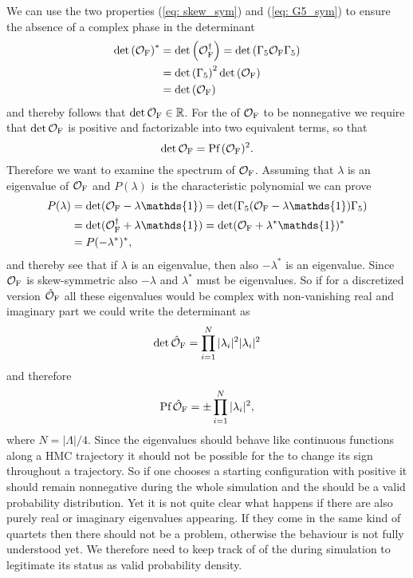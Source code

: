 %
%
We can use the two properties (\ref{eq: skew_sym}) and (\ref{eq: G5_sym}) to ensure the absence of a complex phase in the determinant
%
%
\begin{align}
\det \left(\mathcal{O}_{\rm F}\right)^{*} &= \det  \left( \mathcal{O}_{\rm F}^{\dagger}\right) = \det \left( \Gamma_{5}\mathcal{O}_{\rm F} \Gamma_{5} \right) \notag \\
%
%
&= \det \left(\Gamma_{5}\right)^{2} \det \left(\mathcal{O}_{\rm F}\right) \\
%
%
&= \det \left(\mathcal{O}_{\rm F}\right) \notag
\end{align}
%
%
and thereby follows that $\det\mathcal{O}_{\rm F} \in \mathbb{R}$. For the  of $\mathcal{O}_{\rm F}$ to be nonnegative we require that $\det \mathcal{O}_{\rm F}$ is positive and factorizable into two equivalent terms, so that
%
%
\begin{equation}
\det \mathcal{O}_{\rm F} = \text{Pf}\,(\mathcal{O}_{\rm F})^{2}.
\end{equation}
%
%
Therefore we want to examine the spectrum of $\mathcal{O}_{\rm F}$. Assuming that $\lambda$ is an eigenvalue of $\mathcal{O}_{\rm F}$ and $P(\lambda)$ is the characteristic polynomial we can prove
%
%
\begin{align}
P(\lambda) &= \det (\mathcal{O}_{\rm F} -\lambda\mathds{1}) = \det (\Gamma_{5}(\mathcal{O}_{\rm F} -\lambda\mathds{1})\Gamma_{5}) \notag \\
%
&= \det (\mathcal{O}_{\rm F}^{\dagger}+\lambda\mathds{1}) = \det (\mathcal{O}_{\rm F} +\lambda^{*}\mathds{1})^{*} \\
&= P(-\lambda^{*})^{*}, \notag
\end{align}
%
%
and thereby see that if $\lambda$ is an eigenvalue, then also $-\lambda^{*}$ is an eigenvalue. Since $\mathcal{O}_{\rm F}$ is skew-symmetric also $-\lambda$ and $\lambda^{*}$ must be eigenvalues. So if for a discretized version $\hat{\mathcal{O}}_{\rm F}$ all these eigenvalues would be complex with non-vanishing real and imaginary part we could write the determinant as
%
%
\begin{equation}
\det \hat{\mathcal{O}}_{\rm F} = \prod\limits_{i=1}^{N} \vert \lambda_{i}\vert^{2} \vert \lambda_{i} \vert^{2}
\end{equation}
%
%
and therefore
%
%
\begin{equation}
\text{Pf}\,\hat{\mathcal{O}}_{\rm F} =  \pm\prod\limits_{i=1}^{N} \vert \lambda_{i}\vert^{2},
\end{equation}
%
%
where $N=\vert \mathit{\Lambda}\vert /4$. Since the eigenvalues should behave like continuous functions along a HMC trajectory it should not be possible for the  to change its sign throughout a trajectory. So if one chooses a starting configuration with positive  it should remain nonnegative during the whole simulation and the  should be a valid probability distribution. Yet it is not quite clear what happens if there are also purely real or imaginary eigenvalues appearing. If they come in the same kind of quartets then there should not be a problem, otherwise the behaviour is not fully understood yet. We therefore need to keep track of of the  during simulation to legitimate its status as valid probability density.

